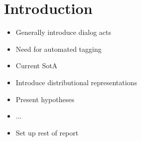 \section{Introduction}\label{sec:intro}
\begin{itemize}
	\item Generally introduce dialog acts
	\item Need for automated tagging
	\item Current SotA
	\item Introduce distributional representations
	\item Present hypotheses
	\item ...
	\item Set up rest of report
\end{itemize}